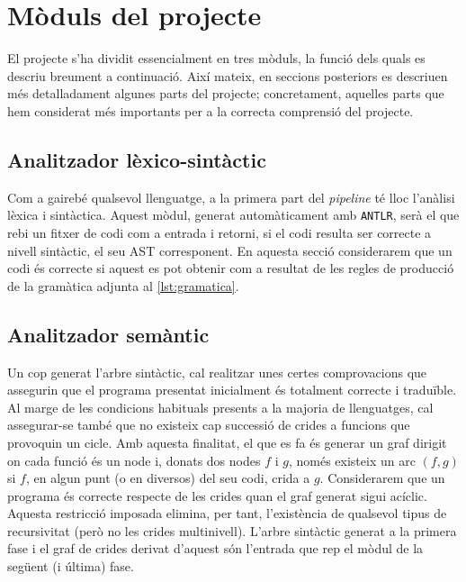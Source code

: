 
\section{Mòduls del projecte}

El projecte s'ha dividit essencialment en tres mòduls, la funció dels quals es 
descriu breument a continuació. Així mateix, en seccions posteriors es 
descriuen més detalladament algunes parts del projecte; concretament, aquelles 
parts que hem considerat més importants per a la correcta comprensió del 
projecte.

\subsection{Analitzador lèxico-sintàctic}
Com a gairebé qualsevol llenguatge, a la primera part del \textit{pipeline} té 
lloc l'anàlisi lèxica i sintàctica. Aquest mòdul, generat automàticament amb 
\texttt{ANTLR}, serà el que rebi un fitxer de codi com a entrada i retorni, si 
el codi resulta ser correcte a nivell sintàctic, el seu AST corresponent. En 
aquesta secció considerarem que un codi és correcte si aquest es pot 
obtenir com a resultat de les regles de producció de la gramàtica adjunta al 
\autoref{lst:gramatica}.

\subsection{Analitzador semàntic}
Un cop generat l'arbre sintàctic, cal realitzar unes certes comprovacions que 
assegurin que el programa presentat inicialment és totalment correcte i 
traduïble. Al marge de les condicions habituals presents a la majoria de 
llenguatges, cal assegurar-se també que no existeix cap successió de crides a 
funcions que provoquin un cicle. Amb aquesta finalitat, el que es fa és
generar un graf dirigit on cada funció és un node i, donats dos nodes \(f\) 
i \(g\), només existeix un arc \((f,g)\) si \(f\), en algun punt (o en 
diversos) del seu codi, crida a \(g\). Considerarem que un programa és correcte 
respecte de les crides quan el graf generat sigui acíclic. Aquesta restricció 
imposada elimina, per tant, l'existència de qualsevol tipus de recursivitat 
(però no les crides multinivell). L'arbre sintàctic generat a la primera fase 
i el graf de crides derivat d'aquest són l'entrada que rep el mòdul de la 
següent (i última) fase.

